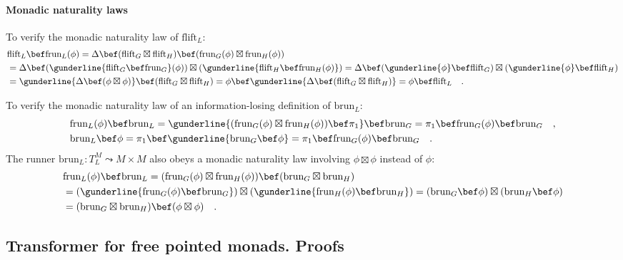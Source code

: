 \paragraph{Monadic naturality laws}

To verify the monadic naturality law of $\text{flift}_{L}$:
\begin{align*}
 & \text{flift}_{L}\bef\text{frun}_{L}(\phi)=\Delta\bef(\text{flift}_{G}\boxtimes\text{flift}_{H})\bef(\text{frun}_{G}(\phi)\boxtimes\text{frun}_{H}(\phi))\\
 & =\Delta\bef(\gunderline{\text{flift}_{G}\bef\text{frun}_{G}}(\phi))\boxtimes(\gunderline{\text{flift}_{H}\bef\text{frun}_{H}(\phi)})=\Delta\bef(\gunderline{\phi}\bef\text{flift}_{G})\boxtimes(\gunderline{\phi}\bef\text{flift}_{H})\\
 & =\gunderline{\Delta\bef(\phi\boxtimes\phi)}\bef(\text{flift}_{G}\boxtimes\text{flift}_{H})=\phi\bef\gunderline{\Delta\bef(\text{flift}_{G}\boxtimes\text{flift}_{H})}=\phi\bef\text{flift}_{L}\quad.
\end{align*}

To verify the monadic naturality law of an information-losing definition
of $\text{brun}_{L}$:
\begin{align*}
 & \text{frun}_{L}(\phi)\bef\text{brun}_{L}=\gunderline{(\text{frun}_{G}(\phi)\boxtimes\text{frun}_{H}(\phi))\bef\pi_{1}}\bef\text{brun}_{G}=\pi_{1}\bef\text{frun}_{G}(\phi)\bef\text{brun}_{G}\quad,\\
 & \text{brun}_{L}\bef\phi=\pi_{1}\bef\gunderline{\text{brun}_{G}\bef\phi}=\pi_{1}\bef\text{frun}_{G}(\phi)\bef\text{brun}_{G}\quad.
\end{align*}
The runner $\text{brun}_{L}:T_{L}^{M}\leadsto M\times M$ also obeys
a monadic naturality law involving $\phi\boxtimes\phi$ instead of
$\phi$:
\begin{align*}
 & \text{frun}_{L}(\phi)\bef\text{brun}_{L}=(\text{frun}_{G}(\phi)\boxtimes\text{frun}_{H}(\phi))\bef(\text{brun}_{G}\boxtimes\text{brun}_{H})\\
 & =(\gunderline{\text{frun}_{G}(\phi)\bef\text{brun}_{G}})\boxtimes(\gunderline{\text{frun}_{H}(\phi)\bef\text{brun}_{H}})=(\text{brun}_{G}\bef\phi)\boxtimes(\text{brun}_{H}\bef\phi)\\
 & =(\text{brun}_{G}\boxtimes\text{brun}_{H})\bef(\phi\boxtimes\phi)\quad.
\end{align*}


\subsection{Transformer for free pointed monads. Proofs}

